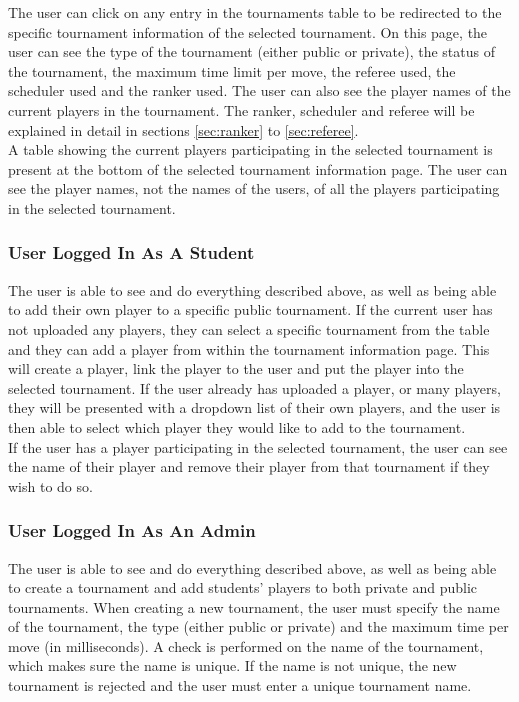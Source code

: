 \documentclass[a4paper, 11pt]{report}
\begin{document}
The user can click on any entry in the tournaments table to be redirected to
the specific tournament information of the selected tournament. On this page, the
user can see the type of the tournament (either public or private), the status
of the tournament, the maximum time limit per move, the referee used, the scheduler
used and the ranker used. The user can also see the player names of the current
players in the tournament. The ranker, scheduler and referee will be explained
in detail in sections \ref{sec:ranker} to \ref{sec:referee}. \\

A table showing the current players participating in the selected tournament is
present at the bottom of the selected tournament information page. The user can
see the player names, not the names of the users, of all the players participating
in the selected tournament.

\subsubsection*{User Logged In As A Student}

The user is able to see and do everything described above, as well as being able
to add their own player to a specific public tournament. If the current user has not
uploaded any players, they can select a specific tournament from the table and
they can add a player from within the tournament information page. This will create
a player, link the player to the user and put the player into the selected
tournament. If the user already has uploaded a player, or many players, they will
be presented with a dropdown list of their own players, and the user is then able
to select which player they would like to add to the tournament. \\

If the user has a player participating in the selected tournament, the user can
see the name of their player and remove their player from that tournament if
they wish to do so.

\subsubsection*{User Logged In As An Admin}

The user is able to see and do everything described above, as well as being able
to create a tournament and add students' players to both private and public
tournaments. When creating a new tournament, the user must specify the name of
the tournament, the type (either public or private) and the maximum time per move
(in milliseconds). A check is performed on the name of the tournament, which makes
sure the name is unique. If the name is not unique, the new tournament is rejected
and the user must enter a unique tournament name. \\
\end{document}
